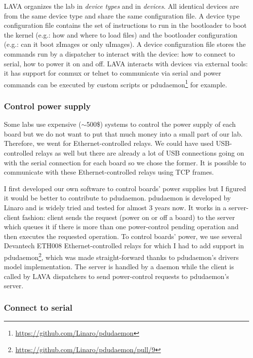 LAVA organizes the lab in \textit{device types} and in \textit{devices}. All identical devices are from the same device type and share the same configuration file. A device type configuration file contains the set of instructions to run in the bootloader to boot the kernel (e.g.: how and where to load files) and the bootloader configuration (e.g.: can it boot zImages or only uImages). A device configuration file stores the commands run by a dispatcher to interact with the device: how to connect to serial, how to power it on and off. LAVA interacts with devices via external tools: it has support for conmux or telnet to communicate via serial and power commands can be executed by custom scripts or pdudaemon\footnote{\url{https://github.com/Linaro/pdudaemon}} for example.

\subsubsection{Control power supply}

Some labs use expensive ($\sim$500\$) systems to control the power supply of each board but we do not want to put that much money into a small part of our lab. Therefore, we went for Ethernet-controlled relays. We could have used USB-controlled relays as well but there are already a lot of USB connections going on with the serial connection for each board so we chose the former. It is possible to communicate with these Ethernet-controlled relays using TCP frames.

I first developed our own software to control boards' power supplies but I figured it would be better to contribute to pdudaemon. pdudaemon is developed by Linaro and is widely tried and tested for almost 3 years now. It works in a server-client fashion: client sends the request (power on or off a board) to the server which queues it if there is more than one power-control pending operation and then executes the requested operation. To control boards' power, we use several Devantech ETH008 Ethernet-controlled relays for which I had to add support in pdudaemon\footnote{\url{https://github.com/Linaro/pdudaemon/pull/9}}, which was made straight-forward thanks to pdudaemon's drivers model implementation. The server is handled by a daemon while the client is called by LAVA dispatchers to send power-control requests to pdudaemon's server.

\subsubsection{Connect to serial}

